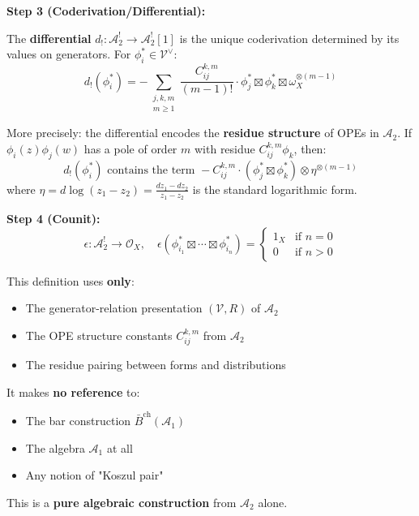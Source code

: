 \begin{definition}
\medskip
\noindent\textbf{Step 3 (Coderivation/Differential):}

The \textbf{differential} $d_!: \mathcal{A}_2^! \to \mathcal{A}_2^![1]$ is the unique coderivation determined by its values on generators. For $\phi_i^* \in \mathcal{V}^{\vee}$:
$$d_!(\phi_i^*) = -\sum_{\substack{j,k,m \\ m \geq 1}} \frac{C_{ij}^{k,m}}{(m-1)!} \cdot \phi_j^* \boxtimes \phi_k^* \boxtimes \omega_X^{\otimes (m-1)}$$

More precisely: the differential encodes the \textbf{residue structure} of OPEs in $\mathcal{A}_2$. If $\phi_i(z)\phi_j(w)$ has a pole of order $m$ with residue $C_{ij}^{k,m}\phi_k$, then:
$$d_!(\phi_i^*) \text{ contains the term } -C_{ij}^{k,m} \cdot (\phi_j^* \boxtimes \phi_k^*) \otimes \eta^{\otimes(m-1)}$$
where $\eta = d\log(z_1 - z_2) = \frac{dz_1 - dz_2}{z_1 - z_2}$ is the standard logarithmic form.

\medskip
\noindent\textbf{Step 4 (Counit):}
$$\epsilon: \mathcal{A}_2^! \to \mathcal{O}_X, \quad \epsilon(\phi_{i_1}^* \boxtimes \cdots \boxtimes \phi_{i_n}^*) = 
\begin{cases}
1_X & \text{if } n = 0 \\
0 & \text{if } n > 0
\end{cases}$$
\end{definition}

\begin{remark}
This definition uses \textbf{only}:
\begin{itemize}
\item The generator-relation presentation $(\mathcal{V}, R)$ of $\mathcal{A}_2$
\item The OPE structure constants $C_{ij}^{k,m}$ from $\mathcal{A}_2$
\item The residue pairing between forms and distributions
\end{itemize}

It makes \textbf{no reference} to:
\begin{itemize}
\item The bar construction $\bar{B}^{\text{ch}}(\mathcal{A}_1)$
\item The algebra $\mathcal{A}_1$ at all
\item Any notion of "Koszul pair"
\end{itemize}

This is a \textbf{pure algebraic construction} from $\mathcal{A}_2$ alone.
\end{remark}


